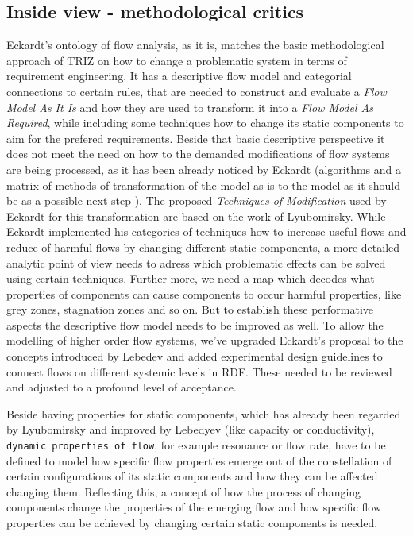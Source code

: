 \documentclass[a4paper,11pt]{article}
\begin{document}
        \subsection{Inside view - methodological critics}
        Eckardt's ontology of flow analysis, as it is, matches the basic 
        methodological approach of TRIZ on how to change a problematic 
        system in terms of requirement engineering. It has a descriptive flow 
        model and categorial connections to certain rules, that are needed to 
        construct and evaluate a \emph{Flow Model As It Is} and how they are 
        used to transform it into a \emph{Flow Model As Required}, while 
        including some techniques how to change its static components to aim 
        for the prefered requirements. Beside that basic descriptive 
        perspective it does not meet the need on how to the demanded 
        modifications of flow systems are being processed, as it has been 
        already noticed by Eckardt (algorithms and a matrix of methods of 
        transformation of the model as is to the model as it should be as a 
        possible next step \cite{Eckardt2020}). The proposed 
        \emph{Techniques of Modification} used by Eckardt for this 
        transformation are based on the work of Lyubomirsky. While Eckardt 
        implemented his categories of techniques how to increase useful flows 
        and reduce of harmful flows by changing different static components, a 
        more detailed analytic point of view needs to adress which problematic 
        effects can be solved using certain techniques. Further more, we need a
        map which decodes what properties of components can cause components to
        occur harmful properties, like grey zones, stagnation zones and so on. 
        But to establish these performative aspects the descriptive flow model 
        needs to be improved as well. To allow the modelling of higher order 
        flow systems, we've upgraded Eckardt's proposal to the concepts 
        introduced by Lebedev \cite{Lebedyev2015} and added experimental design
        guidelines to connect flows on different systemic levels in RDF. These 
        needed to be reviewed and adjusted to a profound level of acceptance.

        Beside having properties for static components, which has already been 
        regarded by Lyubomirsky and improved by Lebedyev (like capacity or 
        conductivity), \texttt{dynamic properties of flow}, for example 
        resonance or flow rate, have to be defined to model how specific flow 
        properties emerge out of the constellation of certain configurations of
        its static components and how they can be affected changing them. 
        Reflecting this, a concept of how the process of changing components 
        change the properties of the emerging flow and how specific flow 
        properties can be achieved by changing certain static components is needed.
        
\end{document}
